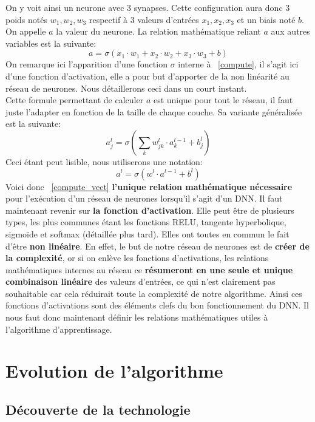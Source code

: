 \documentclass[12pt,a4paper]{extarticle}
\begin{document}
On y voit ainsi un neurone avec 3 synapses. Cette configuration aura donc 3 poids notés $w_1,w_2,w_3$ respectif à 3 valeurs d'entrées $x_1,x_2,x_3$ et un biais noté $b$. On appelle $a$ la valeur du neurone. La relation mathématique reliant $a$ aux autres variables est la suivante:
\begin{equation}
a = \sigma(x_1\cdot w_1+x_2\cdot w_2+x_3\cdot w_3+b)
\label{compute} \end{equation}
On remarque ici l'apparition d'une fonction $\sigma$ interne à ~\eqref{compute}, il s'agit ici d'une fonction d'activation, elle a pour but d'apporter de la non linéarité au réseau de neurones. Nous détaillerons ceci dans un court instant.  \\
Cette formule permettant de calculer $a$ est unique pour tout le réseau, il faut juste l'adapter en fonction de la taille de chaque couche. Sa variante généralisée est la suivante:
\[a^l_j=\sigma(\sum_k w^l_{jk}\cdot a^{l-1}_k+b^l_j)\]
Ceci étant peut lisible, nous utiliserons une notation:
\begin{equation} a^l=\sigma(w^l\cdot a^{l-1}+b^l) \label{compute_vect} \end{equation}
Voici donc ~\eqref{compute_vect} \textbf{l'unique relation mathématique nécessaire} pour l'exécution d'un réseau de neurones lorsqu'il s'agit d'un DNN.
Il faut maintenant revenir sur \textbf{la fonction d'activation}. Elle peut être de plusieurs types, les plus communes étant les fonctions RELU, tangente hyperbolique, sigmoïde et softmax (détaillée plus tard). Elles ont toutes en commun le fait d'être \textbf{non linéaire}. En effet, le but de notre réseau de neurones est de \textbf{créer de la complexité}, or si on enlève les fonctions d'activations, les relations mathématiques internes au réseau ce \textbf{résumeront en une seule et unique combinaison linéaire} des valeurs d'entrées, ce qui n'est clairement pas souhaitable car cela réduirait toute la complexité de notre algorithme. Ainsi ces fonctions d'activations sont des éléments clefs du bon fonctionnement du DNN. Il nous faut donc maintenant définir les relations mathématiques utiles à l'algorithme d'apprentissage. 


\section{Evolution de l'algorithme}

\subsection{Découverte de la technologie}
\end{document}
